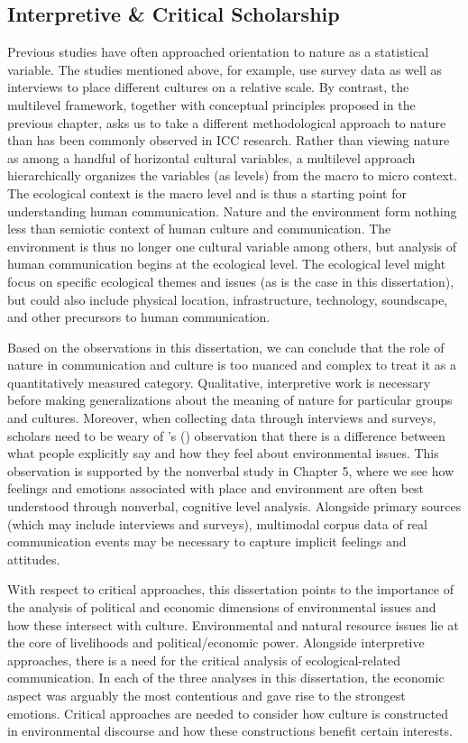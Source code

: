 \subsection{Interpretive \& Critical Scholarship}

Previous studies have often approached orientation to nature as a statistical variable. The studies mentioned above, for example, use survey data as well as interviews to place different cultures on a relative scale. By contrast, the multilevel framework, together with conceptual principles proposed in the previous chapter, asks us to take a different methodological approach to nature than has been commonly observed in ICC research. Rather than viewing nature as among a handful of horizontal cultural variables, a multilevel approach hierarchically organizes the variables (as levels) from the macro to micro context. The ecological context is the macro level and is thus a starting point for understanding human communication. Nature and the environment form nothing less than semiotic context of human culture and communication. The environment is thus no longer one cultural variable among others, but analysis of human communication begins at the ecological level. The ecological level might focus on specific ecological themes and issues (as is the case in this dissertation), but could also include physical location, infrastructure, technology, soundscape, and other precursors to human communication.  

Based on the observations in this dissertation, we can conclude that the role of nature in communication and culture is too nuanced and complex to treat it as a quantitatively measured category. Qualitative, interpretive work is necessary before making generalizations about the meaning of nature for particular groups and cultures. Moreover, when collecting data through interviews and surveys, scholars need to be weary of \citeauthor{Beattie2016}'s (\citeyear{Beattie2016}) observation that there is a difference between what people explicitly say and how they feel about environmental issues. This observation is supported by the nonverbal study in Chapter 5, where we see how feelings and emotions associated with place and environment are often best understood through nonverbal, cognitive level analysis. Alongside primary sources (which may include interviews and surveys), multimodal corpus data of real communication events may be necessary to capture implicit feelings and attitudes.

With respect to critical approaches, this dissertation points to the importance of the analysis of political and economic dimensions of environmental issues and how these intersect with culture. Environmental and natural resource issues lie at the core of livelihoods and political/economic power. Alongside interpretive approaches, there is a need for the critical analysis of ecological-related communication. In each of the three analyses in this dissertation, the economic aspect was arguably the most contentious and gave rise to the strongest emotions. Critical approaches are needed to consider how culture is constructed in environmental discourse and how these constructions benefit certain interests.    

